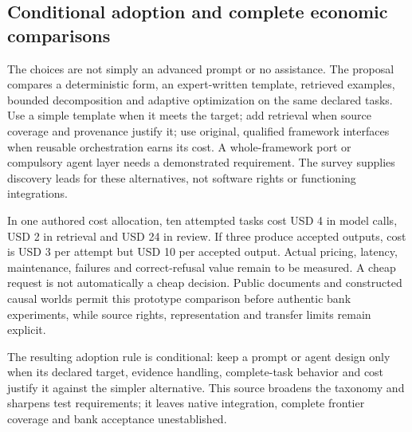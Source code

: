 \subsection{Conditional adoption and complete economic comparisons}

The choices are not simply an advanced prompt or no assistance. The proposal
compares a deterministic form, an expert-written template, retrieved examples,
bounded decomposition and adaptive optimization on the same declared tasks.
Use a simple template when it meets the target; add retrieval when source
coverage and provenance justify it; use original, qualified framework interfaces
when reusable orchestration earns its cost. A whole-framework port or compulsory
agent layer needs a demonstrated requirement. The survey supplies discovery
leads for these alternatives, not software rights or functioning integrations.

In one authored cost allocation, ten attempted tasks cost USD 4 in model calls,
USD 2 in retrieval and USD 24 in review. If three produce accepted outputs,
cost is USD 3 per attempt but USD 10 per accepted output. Actual pricing,
latency, maintenance, failures and correct-refusal value remain to be measured.
A cheap request is not automatically a cheap decision. Public documents and
constructed causal worlds permit this prototype comparison before authentic
bank experiments, while source rights, representation and transfer limits remain
explicit.\citep{exec24_promptengineering_reference}

The resulting adoption rule is conditional: keep a prompt or agent design only
when its declared target, evidence handling, complete-task behavior and cost
justify it against the simpler alternative. This source broadens the taxonomy
and sharpens test requirements; it leaves native integration, complete frontier
coverage and bank acceptance unestablished.
